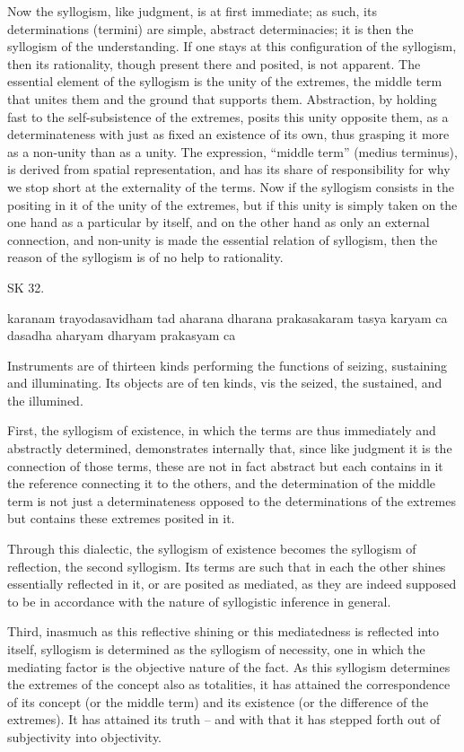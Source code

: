 Now the syllogism, like judgment, is at first immediate; as such, its
determinations (termini) are simple, abstract determinacies; it is then the
syllogism of the understanding. If one stays at this configuration of the
syllogism, then its rationality, though present there and posited, is not
apparent. The essential element of the syllogism is the unity of the extremes,
the middle term that unites them and the ground that supports them.
Abstraction, by holding fast to the self-subsistence of the extremes, posits this
unity opposite them, as a determinateness with just as fixed an existence of its
own, thus grasping it more as a non-unity than as a unity. The expression,
“middle term” (medius terminus), is derived from spatial representation,
and has its share of responsibility for why we stop short at the externality
of the terms. Now if the syllogism consists in the positing in it of the unity
of the extremes, but if this unity is simply taken on the one hand as a
particular by itself, and on the other hand as only an external connection,
and non-unity is made the essential relation of syllogism, then the reason
of the syllogism is of no help to rationality.

SK 32.

karanam trayodasavidham tad aharana dharana prakasakaram
tasya karyam ca dasadha aharyam dharyam prakasyam ca

Instruments are of thirteen kinds performing the functions of
seizing, sustaining and illuminating.
Its objects are of ten kinds, vis
the seized, the sustained, and the illumined.

First, the syllogism of existence, in which the terms are thus
immediately and abstractly determined, demonstrates internally that,
since like judgment it is the connection of those terms,
these are not in fact abstract but each contains in it
the reference connecting it to the others,
and the determination of the middle term is not just
a determinateness opposed to the determinations of the extremes
but contains these extremes posited in it.

Through this dialectic, the syllogism of existence becomes
the syllogism of reflection,  the second syllogism.
Its terms are such that in each the other shines
essentially reflected in it, or are posited as mediated,
as they are indeed supposed to be in accordance with
the nature of syllogistic inference in general.

Third, inasmuch as this reflective shining or this mediatedness is reflected
into itself, syllogism is determined as the syllogism of necessity,
one in which the mediating factor is the objective nature of the fact.
As this syllogism determines the extremes of the concept also as totalities,
it has attained the correspondence of its concept (or the middle term) and
its existence (or the difference of the extremes).
It has attained its truth – and with that it has stepped forth
out of subjectivity into objectivity.

